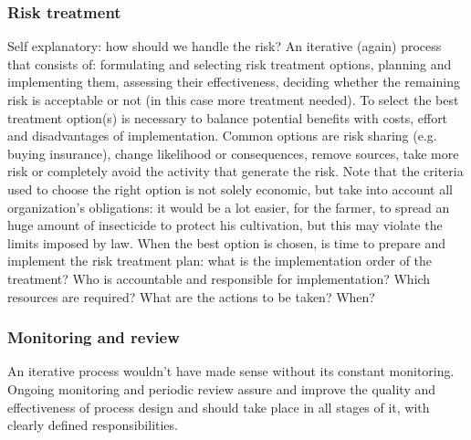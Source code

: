 \subsubsection{Risk treatment}
Self explanatory: how should we handle the risk? An iterative (again) process that consists of: formulating and selecting risk treatment options, planning and implementing them, assessing their effectiveness, deciding whether the remaining risk is acceptable or not (in this case more treatment needed).\newline
To select the best treatment option(s) is necessary to balance potential benefits with costs, effort and disadvantages of implementation. Common options are risk sharing (e.g. buying insurance), change likelihood or consequences, remove sources, take more risk or completely avoid the activity that generate the risk. Note that the criteria used to choose the right option is not solely economic, but take into account all organization's obligations: it would be a lot easier, for the farmer, to spread an huge amount of insecticide to protect his cultivation, but this may violate the limits imposed by law.\newline
When the best option is chosen, is time to prepare and implement the risk treatment plan: what is the implementation order of the treatment? Who is accountable and responsible for implementation? Which resources are required? What are the actions to be taken? When?
\subsubsection{Monitoring and review}
An iterative process wouldn't have made sense without its constant monitoring. Ongoing monitoring and periodic review assure and improve the quality and effectiveness of process design and should take place in all stages of it, with clearly defined responsibilities.
